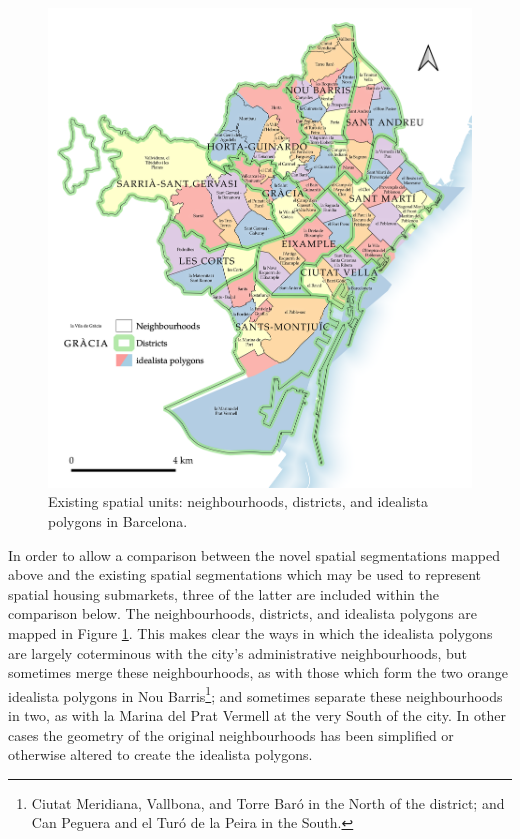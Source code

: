 \documentclass[a4paper, nobind]{templates/ociamthesis}
\begin{document}
\begin{figure}

{\centering \includegraphics[width=.8\paperwidth]{figures/maps/neighbourhoods 2} 

}

\caption[Existing spatial units.]{Existing spatial units: neighbourhoods, districts, and idealista polygons in Barcelona.}\label{fig:neighbourhoods-map-BCN}
\end{figure}

In order to allow a comparison between the novel spatial segmentations mapped above and the existing spatial segmentations which may be used to represent spatial housing submarkets, three of the latter are included within the comparison below. The neighbourhoods, districts, and idealista polygons are mapped in Figure \ref{fig:neighbourhoods-map-BCN}. This makes clear the ways in which the idealista polygons are largely coterminous with the city's administrative neighbourhoods, but sometimes merge these neighbourhoods, as with those which form the two orange idealista polygons in Nou Barris\footnote{Ciutat Meridiana, Vallbona, and Torre Baró in the North of the district; and Can Peguera and el Turó de la Peira in the South.}; and sometimes separate these neighbourhoods in two, as with la Marina del Prat Vermell at the very South of the city. In other cases the geometry of the original neighbourhoods has been simplified or otherwise altered to create the idealista polygons.
\end{document}
